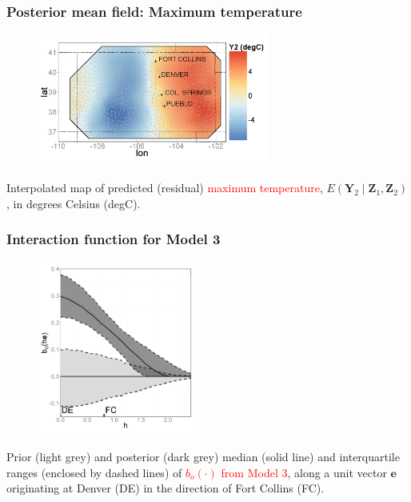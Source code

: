 \documentclass{beamer}
\newcommand{\Yvec}{\mathbf{Y}}
\newcommand{\Zvec}{\mathbf{Z}}
\newcommand{\E}{E}
\begin{document}

\begin{frame}
\frametitle{Posterior mean field: Maximum temperature}
\begin{figure}
\includegraphics[width=3in]{Fig3a2.png}
\end{figure}
\vspace{-.5cm}
Interpolated map of predicted (residual) \textcolor{red}{maximum temperature}, $\E(\Yvec_2 \mid  \Zvec_1,\Zvec_2)$, in degrees Celsius (degC).
\end{frame}


\begin{frame}
\frametitle{Interaction function for Model 3}
\vspace{-0.2in}
\begin{figure}
\includegraphics[width=2in]{Fig3b.png}
\end{figure}
\vspace{-.5cm}
\small{Prior (light grey) and posterior (dark grey) median (solid line) and interquartile ranges (enclosed by dashed lines) of \textcolor{red}{$b_o(\cdot)$ from Model 3}, along a unit vector $\mathbf{e}$ originating at Denver (DE) in the direction of Fort Collins (FC).}
\end{frame}

\end{document}

